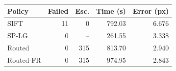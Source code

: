 \begin{tabular}{lrrrr}
\toprule
Policy & Failed & Esc. & Time (s) & Error (px) \\
\midrule
SIFT & 11 & 0 & 792.03 & 6.676 \\
SP-LG & 0 & -- & 261.55 & 3.338 \\
Routed & 0 & 315 & 813.70 & 2.940 \\
Routed-FR & 0 & 315 & 974.95 & 2.843 \\
\bottomrule
\end{tabular}
